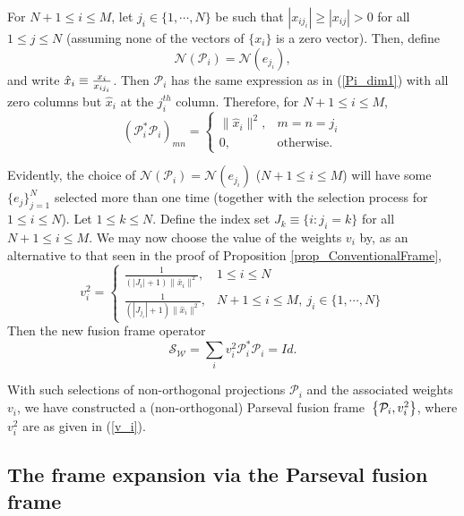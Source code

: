 \documentclass[11pt,reqno]{amsart}
\theoremstyle{remark}
\begin{document}
For $N+1\leq i\leq M$, let $j_i\in \{1,\cdots,N\}$ be such that $|x_{i j_i}|\geq |x_{i j}| >0 $ for all $1\leq j\leq N$ (assuming none of the vectors of $\{x_i\}$ is a zero vector).  Then, define
\begin{equation} \label{Pi_2}
{{\mathcal N}}({{\mathcal P}}_i)={{\mathcal N}}(e_{j_i}),
\end{equation}
and write ${\displaystyle} \hat x_i\equiv \frac{x_i}{x_{i j_i}}$.  Then ${{\mathcal P}}_i$ has the same expression as in
(\ref{Pi_dim1}) with all zero columns but $\hat x_i$ at the $j_i^{th}$ column.
Therefore, for $N+1\leq i\leq M$,
\[
\left({{\mathcal P}}^*_i{{\mathcal P}}_i\right)_{mn}=\left\{\begin{array}{ll}
  \|\hat x_i\|^2, & m=n=j_i \\
  0,              & \text{otherwise}.\end{array}\right.
\]

Evidently, the choice of ${{\mathcal N}}({{\mathcal P}}_i)={{\mathcal N}}(e_{j_i})$ ($N+1\leq i\leq M$) will have some $\{e_j\}_{j=1}^{N}$ selected more than one time (together with the selection process for $1\leq i\leq N$).  Let $1\leq k\leq N$.  Define the index set $J_k\equiv \{i: j_i=k\}$ for all $N+1\leq i\leq M$.   We may now choose the value of the weights $v_i$ by, as an alternative to that seen in
the proof of Proposition \ref{prop_ConventionalFrame},
\begin{equation} \label{v_i}
v_i^2=\left\{\begin{array}{ll}
\frac{1}{(|J_i|+1)\|\bar x_i\|^2}, & 1\leq i\leq N\\
\frac{1}{(|J_{j_i}|+1)\|\hat x_i\|^2}, & N+1\leq i\leq M, \ j_i\in \{1,\cdots,N\}
            \end{array}\right.
\end{equation}
Then the new fusion frame operator
\[
{{\mathcal S}_{{\mathcal W}}}=\sum_i v_i^2{{\mathcal P}}_i^*{{\mathcal P}}_i = Id.
\]

With such selections of non-orthogonal projections ${{\mathcal P}}_i$ and the associated weights $v_i$, we have constructed a (non-orthogonal) Parseval fusion frame ${\displaystyle} \left\{{{\mathcal P}}_i, v_i^2\right\}$, where $v_i^2$
are as given in (\ref{v_i}).

\subsection*{The frame expansion via the Parseval fusion frame}
\end{document}
